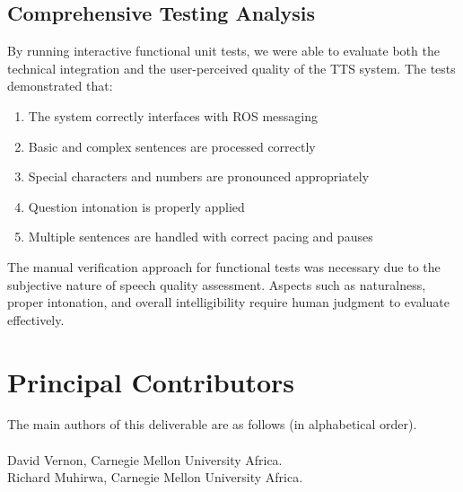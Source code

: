 \documentclass{CSSRforAfrica}
\newcommand{\blank}{~\\}
\begin{document}
\subsection{Comprehensive Testing Analysis}

By running interactive functional unit tests, we were able to evaluate both the technical integration and the user-perceived quality of the TTS system. The tests demonstrated that:

\begin{enumerate}
    \item The system correctly interfaces with ROS messaging
    \item Basic and complex sentences are processed correctly
    \item Special characters and numbers are pronounced appropriately
    \item Question intonation is properly applied
    \item Multiple sentences are handled with correct pacing and pauses
\end{enumerate}

The manual verification approach for functional tests was necessary due to the subjective nature of speech quality assessment. Aspects such as naturalness, proper intonation, and overall intelligibility require human judgment to evaluate effectively.

\newpage






\pagebreak
\section*{Principal Contributors}
\label{contributors}
The main authors of this deliverable are as follows (in alphabetical order).
\blank
~
\blank
David Vernon, Carnegie Mellon University Africa.\\    %
Richard Muhirwa, Carnegie Mellon University Africa.\\    %
                                                                        
\end{document}
